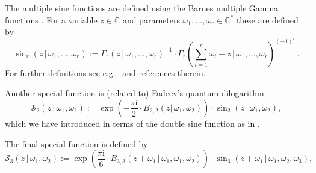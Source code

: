 \documentclass[a4paper,12pt,justification=centering]{article}
\numberwithin{equation}{section}
\newcommand{\I}{{\mathrm i}}
\theoremstyle{plain}%
\theoremstyle{definition}
\begin{document}
\begin{appendix}
The multiple sine functions are defined using the Barnes multiple Gamma functions \cite{Barnes}. For a variable $z\in \mathbb{C}$ and parameters $\omega_1,\ldots,\omega_r \in \mathbb{C}^{*}$ these are defined by
\begin{equation}
    \sin_r(z\,|\, \omega_1,\dots,\omega_r):= \Gamma_{r}(z\, |\, \omega_1,\dots,\omega_r)^{-1} \cdot \Gamma_{r}\left(\sum_{i=1}^r \omega_i - z\, |\, \omega_1,\dots,\omega_r\right)^{(-1)^r} \,.
\end{equation}
For further definitions see e.g.~\cite{BridgelandCon,Ruijsenaars1} and references therein. 

Another special function is (related to) Fadeev's quantum dilogarithm
\begin{equation}\label{g2def}
    \mathcal{S}_2(z\, | \, \omega_1,\omega_2) := \exp\left(-\frac{\pi \I}{2} \cdot B_{2,2}(z|\,\omega_1,\omega_2)\right) \cdot \sin_2(z\, |\, \omega_1,\omega_2),
\end{equation}
which we have introduced in terms of the double sine function as in \cite{BridgelandCon}. 

The final special function is defined by
\begin{equation}\label{g3def}
    \mathcal{S}_3(z\, | \, \omega_1,\omega_2) := \exp\left(\frac{\pi \I}{6} \cdot B_{3,3}(z+\omega_1\,|\,\omega_1,\omega_1,\omega_2)\right) \cdot \sin_3(z+\omega_1\, |\, \omega_1,\omega_2,\omega_3),
\end{equation}





\end{appendix}



%
%
\end{document}
